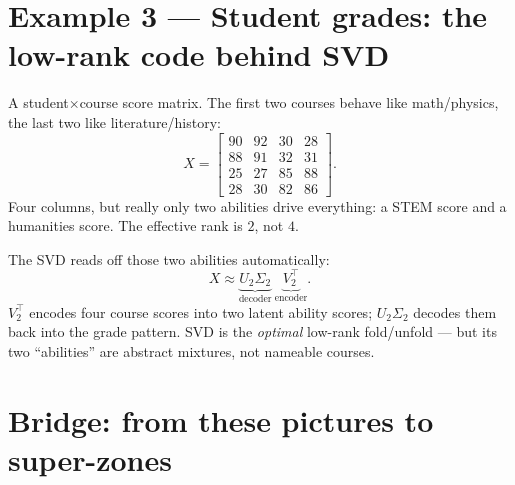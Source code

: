 \documentclass[11pt]{article}
\begin{document}
\section*{Example 3 --- Student grades: the low-rank code behind SVD}

A student$\times$course score matrix. The first two courses behave like
math/physics, the last two like literature/history:
\[
X=\begin{bmatrix}
90&92&30&28\\ 88&91&32&31\\ 25&27&85&88\\ 28&30&82&86
\end{bmatrix}.
\]
Four columns, but really only two abilities drive everything: a STEM score and
a humanities score. The effective rank is $2$, not $4$.

\begin{center}
\end{center}

\noindent The SVD reads off those two abilities automatically:
\[
X \approx \underbrace{U_2\Sigma_2}_{\text{decoder}}\ \underbrace{V_2^{\!\top}}_{\text{encoder}} .
\]
$V_2^{\!\top}$ encodes four course scores into two latent ability scores;
$U_2\Sigma_2$ decodes them back into the grade pattern. SVD is the
\emph{optimal} low-rank fold/unfold --- but its two ``abilities'' are abstract
mixtures, not nameable courses.

\section*{Bridge: from these pictures to super-zones}
\end{document}
